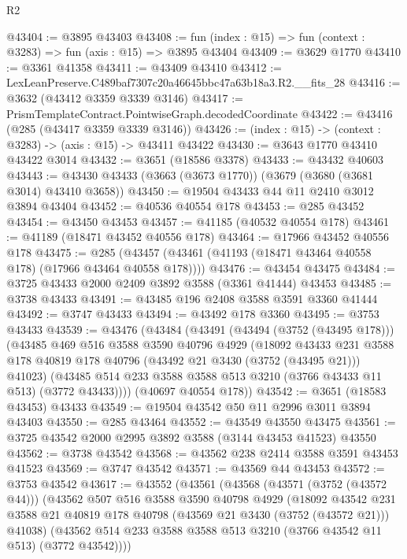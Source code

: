 \begin{lexlean}{R2}
\begin{coremodule}
@43404 := @3895 @43403
@43408 := fun (index : @15) => fun (context : @3283) => fun (axis : @15) => @3895 @43404
@43409 := @3629 @1770
@43410 := @3361 @41358
@43411 := @43409 @43410
@43412 := LexLeanPreserve.C489baf7307c20a46645bbc47a63b18a3.R2.__fits_28
@43416 := @3632 (@43412 @3359 @3339 @3146)
@43417 := PrismTemplateContract.PointwiseGraph.decodedCoordinate
@43422 := @43416 (@285 (@43417 @3359 @3339 @3146))
@43426 := (index : @15) -> (context : @3283) -> (axis : @15) -> @43411 @43422
@43430 := @3643 @1770 @43410 @43422 @3014
@43432 := @3651 (@18586 @3378)
@43433 := @43432 @40603
@43443 := @43430 @43433 (@3663 (@3673 @1770)) (@3679 (@3680 (@3681 @3014) @43410 @3658))
@43450 := @19504 @43433 @44 @11 @2410 @3012 @3894 @43404
@43452 := @40536 @40554 @178
@43453 := @285 @43452
@43454 := @43450 @43453
@43457 := @41185 (@40532 @40554 @178)
@43461 := @41189 (@18471 @43452 @40556 @178)
@43464 := @17966 @43452 @40556 @178
@43475 := @285 (@43457 (@43461 (@41193 (@18471 @43464 @40558 @178) (@17966 @43464 @40558 @178))))
@43476 := @43454 @43475
@43484 := @3725 @43433 @2000 @2409 @3892 @3588 (@3361 @41444) @43453
@43485 := @3738 @43433
@43491 := @43485 @196 @2408 @3588 @3591 @3360 @41444
@43492 := @3747 @43433
@43494 := @43492 @178 @3360
@43495 := @3753 @43433
@43539 := @43476
    (@43484
      (@43491
        (@43494 (@3752 (@43495 @178)))
        (@43485
          @469
          @516
          @3588
          @3590
          @40796
          @4929
          (@18092
            @43433
            @231
            @3588
            @178
            @40819
            @178
            @40796
            (@43492 @21 @3430 (@3752 (@43495 @21)))
            @41023)
          (@43485 @514 @233 @3588 @3588 @513 @3210 (@3766 @43433 @11 @513) (@3772 @43433))))
      (@40697 @40554 @178))
@43542 := @3651 (@18583 @43453) @43433
@43549 := @19504 @43542 @50 @11 @2996 @3011 @3894 @43403
@43550 := @285 @43464
@43552 := @43549 @43550 @43475
@43561 := @3725 @43542 @2000 @2995 @3892 @3588 (@3144 @43453 @41523) @43550
@43562 := @3738 @43542
@43568 := @43562 @238 @2414 @3588 @3591 @43453 @41523
@43569 := @3747 @43542
@43571 := @43569 @44 @43453
@43572 := @3753 @43542
@43617 := @43552
    (@43561
      (@43568
        (@43571 (@3752 (@43572 @44)))
        (@43562
          @507
          @516
          @3588
          @3590
          @40798
          @4929
          (@18092
            @43542
            @231
            @3588
            @21
            @40819
            @178
            @40798
            (@43569 @21 @3430 (@3752 (@43572 @21)))
            @41038)
          (@43562 @514 @233 @3588 @3588 @513 @3210 (@3766 @43542 @11 @513) (@3772 @43542))))

\end{coremodule}
\end{lexlean}
